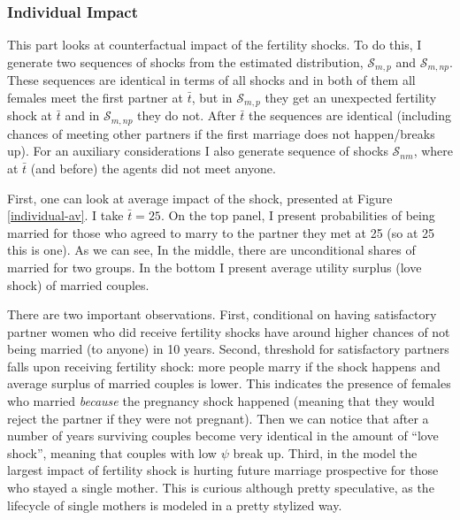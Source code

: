 \documentclass[12pt,letter]{article}
\begin{document}
\subsubsection{Individual Impact}

This part looks at counterfactual impact of the fertility shocks. To do this, I generate two sequences of shocks from the estimated distribution, $\mathcal{S}_{m,p}$ and $\mathcal{S}_{m,np}$. These sequences are identical in terms of all shocks and in both of them all females meet the first partner at $\bar{t}$, but in $\mathcal{S}_{m,p}$ they get an unexpected fertility shock at $\bar{t}$ and in $\mathcal{S}_{m,np}$ they do not. After $\bar{t}$ the sequences are identical (including chances of meeting other partners if the first marriage does not happen/breaks up).  For an auxiliary considerations I also generate sequence of shocks $\mathcal{S}_{nm}$, where at $\bar{t}$ (and before) the agents did not meet anyone. 

First, one can look at average impact of the shock, presented at Figure \ref{individual-av}. I take $\bar{t} = 25$. On the top panel, I present probabilities of being married for those who agreed to marry to the partner they met at 25 (so at 25 this is one). As we can see, In the middle, there are unconditional shares of married for two groups. In the bottom I present average utility surplus (love shock) of married couples.

There are two important observations. First, conditional on having satisfactory partner women who did receive fertility shocks have around higher chances of not being married (to anyone) in 10 years. Second, threshold for satisfactory partners falls upon receiving fertility shock: more people marry if the shock happens and average surplus of married couples is lower. This indicates the presence of females who married \emph{because} the pregnancy shock happened (meaning that they would reject the partner if they were not pregnant). Then we can notice that after a number of years surviving couples become very identical in the amount of ``love shock'', meaning that couples with low $\psi$ break up. Third, in the model the largest impact of fertility shock is hurting future marriage prospective for those who stayed a single mother. This is curious although pretty speculative, as the lifecycle of single mothers is modeled in a pretty stylized way.
\end{document}
